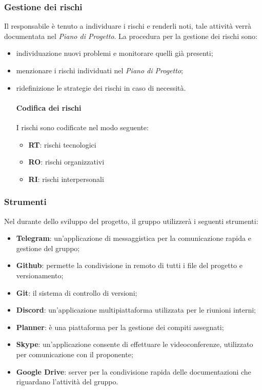 \subsubsection{Gestione dei rischi}
Il responsabile è tenuto a individuare i rischi e renderli noti, tale attività verrà documentata nel \textit{Piano di Progetto}. La procedura per la gestione dei rischi sono: 
\begin{itemize}
\item individuazione nuovi problemi e monitorare quelli già presenti;
\item menzionare i rischi individuati nel \textit{Piano di Progetto}; 
\item ridefinizione le strategie dei rischi in caso di necessità. \newline \newline

\paragraph{Codifica dei rischi} 
I rischi sono codificate nel modo seguente: 
\begin{itemize}
\item  \textbf{RT}: rischi tecnologici 
\item \textbf{RO}: rischi organizzativi
\item   \textbf{RI}: rischi interpersonali
\end{itemize}
\end{itemize}
\subsubsection{Strumenti}
Nel durante dello sviluppo del progetto, il gruppo utilizzerà i seguenti strumenti: 
\begin{itemize}
\item \textbf{Telegram\glo}: un'applicazione di messaggistica per la comunicazione rapida e gestione del gruppo; 
\item \textbf{Github\glo}: permette la condivisione in remoto di tutti i file del progetto e versionamento;
\item \textbf{Git\glo}: il sistema di controllo di versioni;
\item \textbf{Discord}: un'applicazione multipiattaforma utilizzata per le riunioni interni;
\item \textbf{Planner}: è una piattaforma per la gestione dei compiti assegnati;
\item \textbf{Skype}: un'applicazione consente di effettuare le videoconferenze, utilizzato per comunicazione con il proponente;
\item \textbf{Google Drive}: server per la condivisione rapida delle documentazioni che riguardano l'attività del gruppo.
\end{itemize}